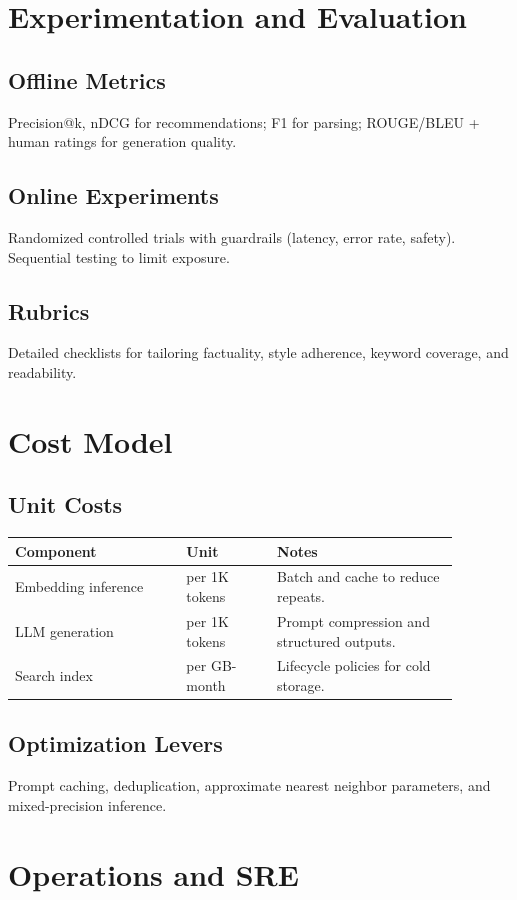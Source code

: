 \documentclass[12pt,a4paper]{article}
\begin{document}
\section{Experimentation and Evaluation}
\subsection{Offline Metrics}
Precision@k, nDCG for recommendations; F1 for parsing; ROUGE/BLEU + human ratings for generation quality.
\subsection{Online Experiments}
Randomized controlled trials with guardrails (latency, error rate, safety). Sequential testing to limit exposure.
\subsection{Rubrics}
Detailed checklists for tailoring factuality, style adherence, keyword coverage, and readability.

\section{Cost Model}
\subsection{Unit Costs}
\begin{longtable}{p{0.34\linewidth} p{0.18\linewidth} p{0.36\linewidth}}
\toprule
\textbf{Component} & \textbf{Unit} & \textbf{Notes}\\
\midrule
Embedding inference & per 1K tokens & Batch and cache to reduce repeats.\\
LLM generation & per 1K tokens & Prompt compression and structured outputs.\\
Search index & per GB-month & Lifecycle policies for cold storage.\\
\bottomrule
\end{longtable}
\subsection{Optimization Levers}
Prompt caching, deduplication, approximate nearest neighbor parameters, and mixed-precision inference.

\section{Operations and SRE}
\end{document}
